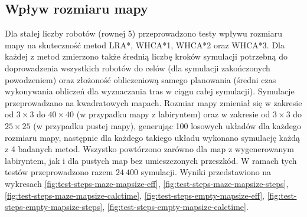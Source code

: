 \subsection{Wpływ rozmiaru mapy} %
\label{ch:tests-function-mapsize}
Dla stałej liczby robotów (rownej 5) przeprowadzono testy wpływu rozmiaru mapy na skuteczność metod LRA*, WHCA*1, WHCA*2 oraz WHCA*3.
Dla każdej z metod zmierzono także średnią liczbę kroków symulacji potrzebną do doprowadzenia wszystkich robotów do celów (dla symulacji zakończonych powodzeniem) oraz złożoność obliczeniową samego planowania (średni czas wykonywania obliczeń dla wyznaczania tras w ciągu całej symulacji).
Symulacje przeprowadzano na kwadratowych mapach.
Rozmiar mapy zmieniał się w zakresie od $3 \times 3$ do $40 \times 40$ (w przypadku mapy z labiryntem) oraz w zakresie od $3 \times 3$ do $25 \times 25$ (w przypadku pustej mapy), generując 100 losowych układów dla każdego rozmiaru mapy, następnie dla każdego takiego układu wykonano symulację każdą z 4 badanych metod.
Wszystko powtórzono zarówno dla map z wygenerowanym labiryntem, jak i dla pustych map bez umieszczonych przeszkód.
W ramach tych testów przeprowadzono razem $24\ 400$ symulacji.
Wyniki przedstawiono na wykresach \ref{fig:test-steps-maze-mapsize-eff}, \ref{fig:test-steps-maze-mapsize-steps}, \ref{fig:test-steps-maze-mapsize-calctime}, \ref{fig:test-steps-empty-mapsize-eff}, \ref{fig:test-steps-empty-mapsize-steps}, \ref{fig:test-steps-empty-mapsize-calctime}.


